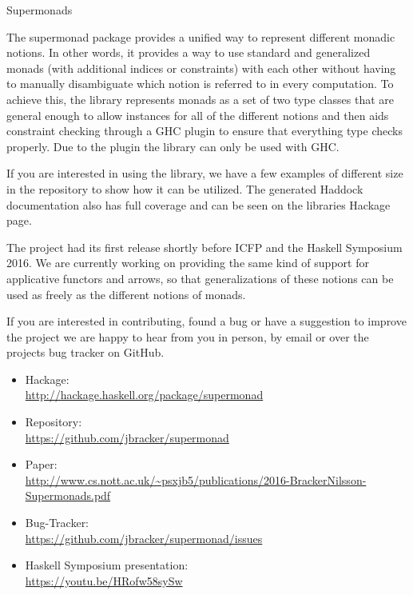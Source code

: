 \documentclass[DIV16,twocolumn,10pt]{scrreprt}
\begin{document}
\begin{hcarentry}{Supermonads}
\makeheader

The supermonad package provides a unified way to represent different 
monadic notions. In other words, it provides a way to use standard and 
generalized monads (with additional indices or constraints)
with each other without having to manually disambiguate which notion 
is referred to in every computation. To achieve this, the library represents 
monads as a set of two type classes that are general enough to 
allow instances for all of the different notions and then aids 
constraint checking through a GHC plugin to ensure that everything type checks properly.
Due to the plugin the library can only be used with GHC.

If you are interested in using the library, we have a few examples of different
size in the repository to show how it can be utilized. The generated Haddock 
documentation also has full coverage and can be seen on the libraries 
Hackage page.

The project had its first release shortly before ICFP and the Haskell Symposium 2016.
We are currently working on providing the same kind of support for applicative
functors and arrows, so that generalizations of these notions can be 
used as freely as the different notions of monads.

If you are interested in contributing, found a bug or have a suggestion 
to improve the project we are happy to hear from 
you in person, by email or over the projects bug tracker on GitHub.

\FurtherReading
\begin{itemize}
  \item Hackage:\\ 
        \url{http://hackage.haskell.org/package/supermonad}
  \item Repository:\\ 
        \url{https://github.com/jbracker/supermonad}
  \item Paper:\\ 
        \url{http://www.cs.nott.ac.uk/~psxjb5/publications/2016-BrackerNilsson-Supermonads.pdf}
  \item Bug-Tracker:\\ 
        \url{https://github.com/jbracker/supermonad/issues}
  \item Haskell Symposium presentation:\\
        \url{https://youtu.be/HRofw58sySw}
\end{itemize}

\end{hcarentry}
\end{document}
